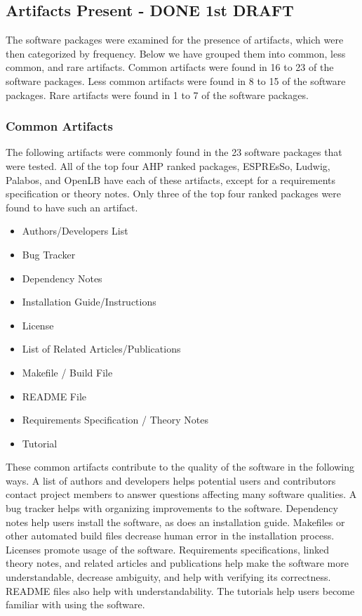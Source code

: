 \documentclass[12pt, notitlepage]{article}
\begin{document}
\subsection{Artifacts Present - DONE 1st DRAFT}\label{artifacts}

The software packages were examined for the presence of artifacts, which were then categorized by frequency. Below we have grouped them into common, less common, and rare artifacts. Common artifacts were found in 16 to 23 of the software packages. Less common artifacts were found in 8 to 15 of the software packages. Rare artifacts were found in 1 to 7 of the software packages. 

\subsubsection{Common Artifacts}
The following artifacts were commonly found in the 23 software packages that were tested. All of the top four AHP ranked packages, ESPREsSo, Ludwig, Palabos, and OpenLB have each of these artifacts, except for a requirements specification or theory notes. Only three of the top four ranked packages were found to have such an artifact. 

\begin{singlespace}
\begin{multicols}{2}	
\begin{itemize}
	\item Authors/Developers List
	\item Bug Tracker
	\item Dependency Notes 
	\item Installation Guide/Instructions 
	\item License
	\item List of Related Articles/Publications 
	\item Makefile / Build File 
	\item README File 
	\item Requirements Specification / Theory Notes
	\item Tutorial
\end{itemize}
\end{multicols}
\end{singlespace}

These common artifacts contribute to the quality of the software in the following ways. A list of authors and developers helps potential users and contributors contact project members to answer questions affecting many software qualities. A bug tracker helps with organizing improvements to the software. Dependency notes help users install the software, as does an installation guide. Makefiles or other automated build files decrease human error in the installation process. Licenses promote usage of the software. Requirements specifications, linked theory notes, and related articles and publications help make the software more understandable, decrease ambiguity, and help with verifying its correctness. README files also help with understandability. The tutorials help users become familiar with using the software.
\end{document}
